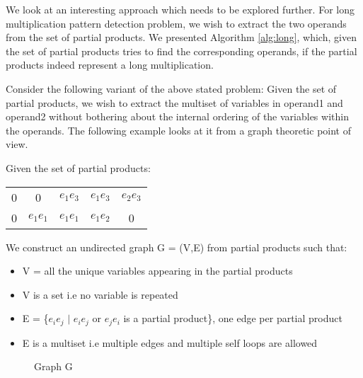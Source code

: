 We look at an interesting approach which needs to be explored further. For long multiplication pattern detection problem, we wish to extract the two operands from the set of partial products. We presented Algorithm \ref{alg:long}, which, given the set of partial products tries to find the corresponding operands, if the partial products indeed represent a long multiplication. 

Consider the following variant of the above stated problem: Given the set of partial products, we wish to extract the multiset of variables in operand1 and operand2 without bothering about the internal ordering of the variables within the operands. The following example looks at it from a graph theoretic point of view.

Given the set of partial products:

\begin{center}

\begin{tabu}{c c c c c}


0 & 0 & $e_1 e_3$ & $e_1 e_3$ & $e_2 e_3$ \\

0 & $e_1 e_1$ & $e_1 e_1$  & $e_1 e_2$ & 0\\

\end{tabu}
\end{center}

We construct an undirected graph G = (V,E) from partial products such that:

\begin{itemize}
\item V = all the unique variables appearing in the partial products
\item V is a set i.e no variable is repeated
\item E = \{$e_i e_j$ $\mid$ $e_i e_j$ or $e_j e_i$ is a partial product\}, one edge per partial product
\item E is a multiset i.e multiple edges and multiple self loops are allowed
\end{itemize}

\begin{figure}

\begin{center}


\caption{Graph G}

\end{center}
\end{figure}

